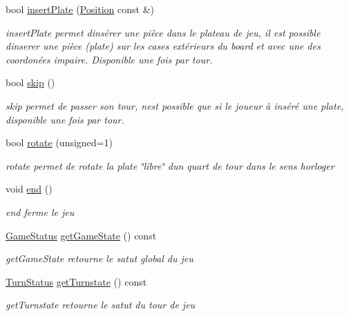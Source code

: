 \begin{DoxyCompactItemize}
bool \mbox{\hyperlink{class_game_a2e527b9d67d6f70a1b911a8e4fca77e4}{insert\+Plate}} (\mbox{\hyperlink{class_position}{Position}} const \&)
\begin{DoxyCompactList}\small\item\em insert\+Plate permet d\textquotesingle{}insérer une pièce dans le plateau de jeu, il est possible d\textquotesingle{}inserer une pièce (plate) sur les cases extérieurs du board et avec une des coordonées impaire. Disponible une fois par tour. \end{DoxyCompactList}\item 
bool \mbox{\hyperlink{class_game_a1d391affe8e71a520a9e210e76b23b45}{skip}} ()
\begin{DoxyCompactList}\small\item\em skip permet de passer son tour, n\textquotesingle{}est possible que si le joueur à inséré une plate, disponible une fois par tour. \end{DoxyCompactList}\item 
bool \mbox{\hyperlink{class_game_a6ba6dd6ff7977278e7884642d167549d}{rotate}} (unsigned=1)
\begin{DoxyCompactList}\small\item\em rotate permet de rotate la plate \char`\"{}libre\char`\"{} d\textquotesingle{}un quart de tour dans le sens horloger \end{DoxyCompactList}\item 
\mbox{\label{class_game_aa2d938aa918268060e63980c7efd86f8}} 
void \mbox{\hyperlink{class_game_aa2d938aa918268060e63980c7efd86f8}{end}} ()
\begin{DoxyCompactList}\small\item\em end ferme le jeu \end{DoxyCompactList}\item 
\mbox{\hyperlink{class_game_ad7fdf24774752f47b6a14827e8bbc073}{Game\+Status}} \mbox{\hyperlink{class_game_abfd280f5fdc614d8542058ca7ac82ea5}{get\+Game\+State}} () const
\begin{DoxyCompactList}\small\item\em get\+Game\+State retourne le satut global du jeu \end{DoxyCompactList}\item 
\mbox{\hyperlink{class_game_ad84f6c74c0b4b323fe4b13b7ad31f696}{Turn\+Status}} \mbox{\hyperlink{class_game_a73c4d8e59b1ad43982115e9ff3be4d80}{get\+Turnstate}} () const
\begin{DoxyCompactList}\small\item\em get\+Turnstate retourne le satut du tour de jeu \end{DoxyCompactList}\item 

\end{DoxyCompactItemize}
